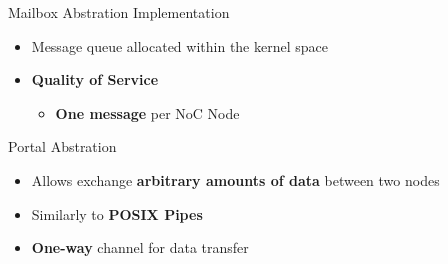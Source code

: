 		\begin{frame}[fragile]{Mailbox Abstration Implementation}
			\begin{itemize}
				\item Message queue allocated within the kernel space
				\item \textbf{Quality of Service}
				\begin{itemize}
					\item \textbf{One message} per NoC Node
				\end{itemize}
			\end{itemize}


			
		\end{frame}

		\begin{frame}[fragile]{Portal Abstration}
			\begin{itemize}
				\item Allows exchange \textbf{arbitrary amounts of data} between two nodes
				\item Similarly to \textbf{POSIX Pipes}
				\item \textbf{One-way} channel for data transfer
			\end{itemize}


		\end{frame}

